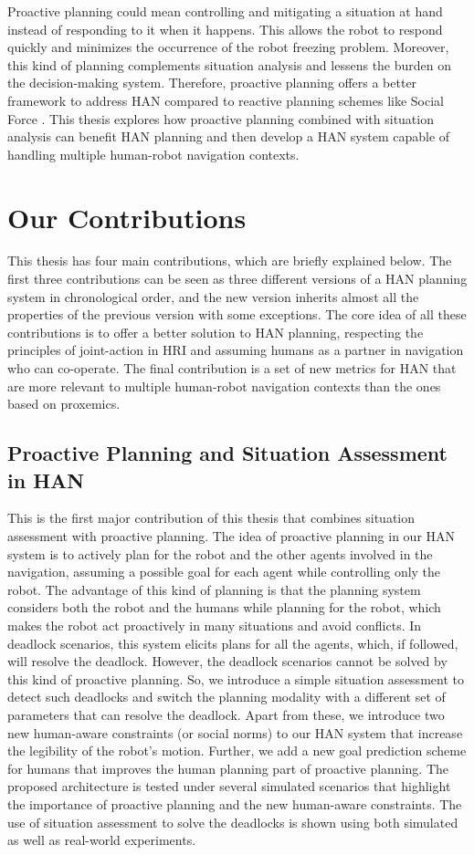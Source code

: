 Proactive planning could mean controlling and mitigating a situation at hand instead of responding to it when it happens. This allows the robot to respond quickly and minimizes the occurrence of the robot freezing problem. Moreover, this kind of planning complements situation analysis and lessens the burden on the decision-making system. Therefore, proactive planning offers a better framework to address HAN compared to reactive planning schemes like Social Force \cite{ferrer2013social}. This thesis explores how proactive planning combined with situation analysis can benefit HAN planning and then develop a HAN system capable of handling multiple human-robot navigation contexts. 

\section*{Our Contributions}
This thesis has four main contributions, which are briefly explained below. The first three contributions can be seen as three different versions of a HAN planning system in chronological order, and the new version inherits almost all the properties of the previous version with some exceptions. The core idea of all these contributions is to offer a better solution to HAN planning, respecting the principles of joint-action in HRI and assuming humans as a partner in navigation who can co-operate. The final contribution is a set of new metrics for HAN that are more relevant to multiple human-robot navigation contexts than the ones based on proxemics.   

\subsection*{Proactive Planning and Situation Assessment in HAN}
This is the first major contribution of this thesis that combines situation assessment with proactive planning. The idea of proactive planning in our HAN system is to actively plan for the robot and the other agents involved in the navigation, assuming a possible goal for each agent while controlling only the robot. The advantage of this kind of planning is that the planning system considers both the robot and the humans while planning for the robot, which makes the robot act proactively in many situations and avoid conflicts. In deadlock scenarios, this system elicits plans for all the agents, which, if followed, will resolve the deadlock. However, the deadlock scenarios cannot be solved by this kind of proactive planning. So, we introduce a simple situation assessment to detect such deadlocks and switch the planning modality with a different set of parameters that can resolve the deadlock. Apart from these, we introduce two new human-aware constraints (or social norms) to our HAN system that increase the legibility of the robot's motion. Further, we add a new goal prediction scheme for humans that improves the human planning part of proactive planning. The proposed architecture is tested under several simulated scenarios that highlight the importance of proactive planning and the new human-aware constraints. The use of situation assessment to solve the deadlocks is shown using both simulated as well as real-world experiments.

